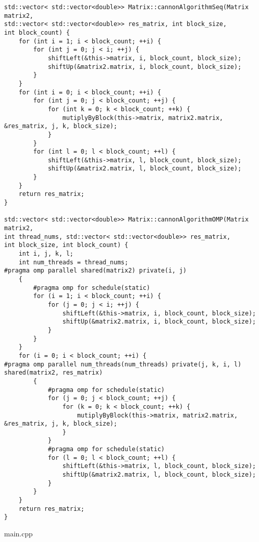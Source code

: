 \documentclass{report}
\begin{document}
\begin{lstlisting}
std::vector< std::vector<double>> Matrix::cannonAlgorithmSeq(Matrix matrix2,
std::vector< std::vector<double>> res_matrix, int block_size,
int block_count) {
    for (int i = 1; i < block_count; ++i) {
        for (int j = 0; j < i; ++j) {
            shiftLeft(&this->matrix, i, block_count, block_size);
            shiftUp(&matrix2.matrix, i, block_count, block_size);
        }
    }
    for (int i = 0; i < block_count; ++i) {
        for (int j = 0; j < block_count; ++j) {
            for (int k = 0; k < block_count; ++k) {
                mutiplyByBlock(this->matrix, matrix2.matrix, &res_matrix, j, k, block_size);
            }
        }
        for (int l = 0; l < block_count; ++l) {
            shiftLeft(&this->matrix, l, block_count, block_size);
            shiftUp(&matrix2.matrix, l, block_count, block_size);
        }
    }
    return res_matrix;
}

std::vector< std::vector<double>> Matrix::cannonAlgorithmOMP(Matrix matrix2,
int thread_nums, std::vector< std::vector<double>> res_matrix,
int block_size, int block_count) {
    int i, j, k, l;
    int num_threads = thread_nums;
#pragma omp parallel shared(matrix2) private(i, j)
    {
        #pragma omp for schedule(static)
        for (i = 1; i < block_count; ++i) {
            for (j = 0; j < i; ++j) {
                shiftLeft(&this->matrix, i, block_count, block_size);
                shiftUp(&matrix2.matrix, i, block_count, block_size);
            }
        }
    }
    for (i = 0; i < block_count; ++i) {
#pragma omp parallel num_threads(num_threads) private(j, k, i, l) shared(matrix2, res_matrix)
        {
            #pragma omp for schedule(static)
            for (j = 0; j < block_count; ++j) {
                for (k = 0; k < block_count; ++k) {
                    mutiplyByBlock(this->matrix, matrix2.matrix, &res_matrix, j, k, block_size);
                }
            }
            #pragma omp for schedule(static)
            for (l = 0; l < block_count; ++l) {
                shiftLeft(&this->matrix, l, block_count, block_size);
                shiftUp(&matrix2.matrix, l, block_count, block_size);
            }
        }
    }
    return res_matrix;
}
\end{lstlisting}
main.cpp
\end{document}
